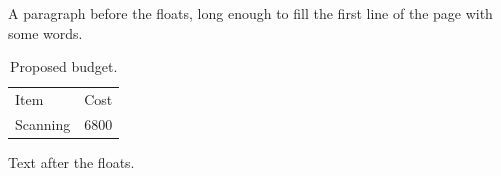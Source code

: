 \documentclass{scrartcl}
\begin{document}
A paragraph before the floats, long enough to fill the first line of the page with some words.
\begin{table}
\centering
\begin{tabular}{lr}
Item & Cost \\
Scanning & 6800 \\
\end{tabular}
\caption{Proposed budget.}
\end{table}
Text after the floats.
\end{document}
